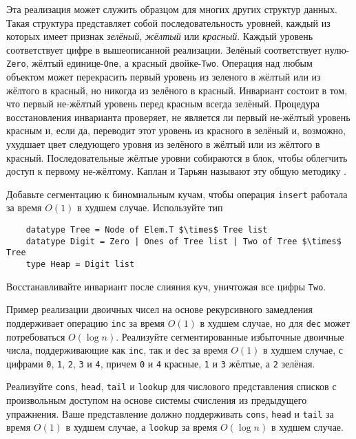 Эта реализация может служить образцом для многих других структур
данных. Такая структура представляет собой последовательность уровней,
каждый из которых имеет признак \emph{зелёный}, \emph{жёлтый} или
\emph{красный}. Каждый уровень
соответствует цифре в вышеописанной реализации. Зелёный соответствует
нулю-\lstinline!Zero!, жёлтый единице-\lstinline!One!, а красный
двойке-\lstinline!Two!. Операция над любым объектом может перекрасить
первый уровень из зеленого в жёлтый или из жёлтого в красный, но
никогда из зелёного в красный. Инвариант состоит в том, что первый
не-жёлтый уровень перед красным всегда зелёный. Процедура
восстановления инварианта проверяет, не является ли первый не-жёлтый
уровень красным и, если да, переводит этот уровень из красного в
зелёный и, возможно, ухудшает цвет следующего уровня из зелёного в
жёлтый или из жёлтого в красный. Последовательные жёлтые уровни
собираются в блок, чтобы облегчить доступ к первому не-жёлтому. Каплан
и Тарьян \cite{KaplanTarjan1995} называют эту общую методику
.

\begin{exercise}\label{ex:9.11}
  Добавьте сегментацию к биномиальным кучам, чтобы операция
  \lstinline!insert! работала за время $O(1)$ в худшем
  случае. Используйте тип
  \begin{lstlisting}
    datatype Tree = Node of Elem.T $\times$ Tree list
    datatype Digit = Zero | Ones of Tree list | Two of Tree $\times$ Tree
    type Heap = Digit list
  \end{lstlisting}
  Восстанавливайте инвариант после слияния куч, уничтожая все цифры \lstinline!Two!.
\end{exercise}

\begin{exercise}\label{ex:9.12}
  Пример реализации двоичных чисел на основе рекурсивного замедления
  поддерживает операцию \lstinline!inc! за время $O(1)$ в худшем
  случае, но для \lstinline!dec! может потребоваться $O(\log
  n)$. Реализуйте сегментированные избыточные двоичные числа,
  поддерживающие как \lstinline!inc!, так и \lstinline!dec! за время
  $O(1)$ в худшем случае, с цифрами \texttt{0}, \texttt{1},
  \texttt{2}, \texttt{3} и \texttt{4}, причем \texttt{0} и \texttt{4}
  красные, \texttt{1} и \texttt{3} жёлтые, а \texttt{2} зелёная.
\end{exercise}

\begin{exercise}\label{ex:9.13}
  Реализуйте \lstinline!cons!, \lstinline!head!, \lstinline!tail! и
  \lstinline!lookup! для числового представления списков с
  произвольным доступом на основе системы счисления из предыдущего
  упражнения. Ваше представление должно поддерживать \lstinline!cons!,
  \lstinline!head! и \lstinline!tail! за время $O(1)$ в худшем случае,
  а \lstinline!lookup! за время $O(\log n)$ в худшем случае.
\end{exercise}

